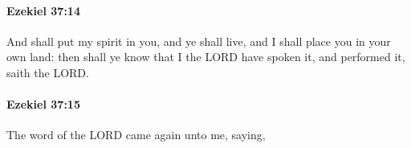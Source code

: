 		\paragraph{Ezekiel 37:14} %
			\label{EZEKIEL-37-14}

			And shall put my spirit in you, and ye shall live, and I shall place you in your own land: then shall ye know that I the LORD have spoken it, and performed it, saith the LORD.


		\paragraph{Ezekiel 37:15} %
			\label{EZEKIEL-37-15}

			The word of the LORD came again unto me, saying,


